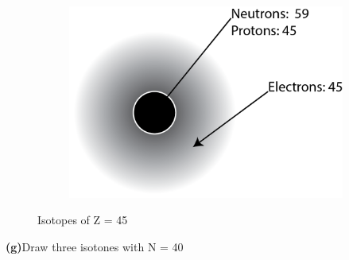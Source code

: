 \documentclass[11pt]{article}
\renewcommand{\part}[1] {\vspace{.10in} {\bf (#1)}}
\begin{document}
\begin{figure}[!ht]
\begin{subfigure}[b]{0.3\textwidth}
	\end{subfigure}%
	~
	\begin{subfigure}[b]{0.3\textwidth}
		\centering
		\includegraphics[width=\textwidth]{HW2_104Rh.png}
	\end{subfigure}
	\caption{Isotopes of Z = 45}
	\label{fig:Isotopes}
\end{figure}

\part{g}{Draw three isotones with N = 40}
\end{document}
